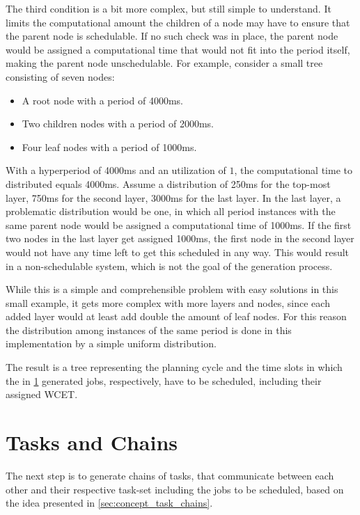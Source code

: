 The third condition is a bit more complex, but still simple to understand.
It limits the computational amount the children of a node may have to ensure that the parent node is schedulable.
If no such check was in place, the parent node would be assigned a computational time that would not fit into the period itself, making the parent node unschedulable.
For example, consider a small tree consisting of seven nodes:
\begin{itemize}
    \item A root node with a period of 4000ms.
    \item Two children nodes with a period of 2000ms.
    \item Four leaf nodes with a period of 1000ms.
\end{itemize}
With a hyperperiod of 4000ms and an utilization of $1$, the computational time to distributed equals 4000ms.
Assume a distribution of 250ms for the top-most layer, 750ms for the second layer, 3000ms for the last layer.
In the last layer, a problematic distribution would be one, in which all period instances with the same parent node would be assigned a computational time of 1000ms.
If the first two nodes in the last layer get assigned 1000ms, the first node in the second layer would not have any time left to get this scheduled in any way.
This would result in a non-schedulable system, which is not the goal of the generation process.

While this is a simple and comprehensible problem with easy solutions in this small example, it gets more complex with more layers and nodes, since each added layer would at least add double the amount of leaf nodes.
For this reason the distribution among instances of the same period is done in this implementation by a simple uniform distribution.

The result is a tree representing the planning cycle and the time slots in which the in \cref{subsec:impl:tasks-and-chains} generated jobs, respectively, have to be scheduled, including their assigned \ac{WCET}.

\section{Tasks and Chains}\label{subsec:impl:tasks-and-chains}
The next step is to generate chains of tasks, that communicate between each other and their respective task-set including the jobs to be scheduled, based on the idea presented in \cref{sec:concept_task_chains}.

